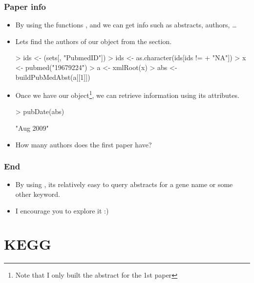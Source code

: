 \begin{frame}
  \frametitle{Paper info}
  \begin{itemize}
  \item By using the functions ,  and  we can get info such as abstracts, authors, \ldots
  \item Lets find the authors of our  object from the  section.
\begin{Schunk}
\begin{Sinput}
> ids <- (sets[, "PubmedID"])
> ids <- as.character(ids[ids != 
+     "NA"])
> x <- pubmed("19679224")
> a <- xmlRoot(x)
> abs <- buildPubMedAbst(a[[1]])
\end{Sinput}
\end{Schunk}
  \item Once we have our  object\footnote{Note that I only built the abstract for the 1st paper}, we can retrieve information using its \alert{attributes}.
\begin{Schunk}
\begin{Sinput}
> pubDate(abs)
\end{Sinput}
\begin{Soutput}
[1] "Aug 2009"
\end{Soutput}
\end{Schunk}
  \item How many authors does the first paper have?
  \end{itemize}
\end{frame}

\begin{frame}[allowframebreaks]
  \frametitle{End}
  \begin{itemize}
  \item By using , its relatively easy to query abstracts for a gene name or some other keyword.
  \item I encourage you to explore it :)
  \end{itemize}
\end{frame}

\section{KEGG}

